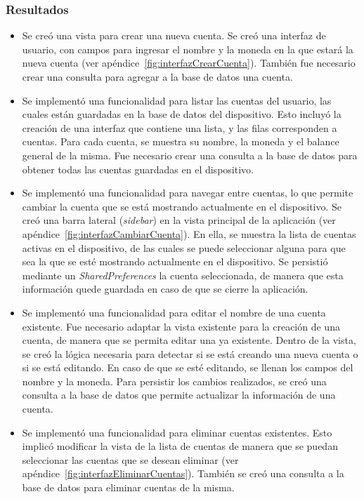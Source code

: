 \subsubsection{Resultados}
\begin{itemize}

\item Se creó una vista para crear una nueva cuenta. Se creó una interfaz de usuario, con campos para ingresar el nombre y la moneda en la que estará la nueva cuenta (ver apéndice~\ref{fig:interfazCrearCuenta}). También fue necesario crear una consulta para agregar a la base de datos una cuenta.
\item Se implementó una funcionalidad para listar las cuentas del usuario, las cuales están guardadas en la base de datos del dispositivo. Esto incluyó la creación de una interfaz que contiene una lista, y las filas corresponden a cuentas. Para cada cuenta, se muestra su nombre, la moneda y el balance general de la misma. Fue necesario crear una consulta a la base de datos para obtener todas las cuentas guardadas en el dispositivo.
\item Se implementó una funcionalidad para navegar entre cuentas, lo que permite cambiar la cuenta que se está mostrando actualmente en el dispositivo. Se creó una barra lateral (\textit{sidebar}) en la vista principal de la aplicación (ver apéndice~\ref{fig:interfazCambiarCuenta}). En ella, se muestra la lista de cuentas activas en el dispositivo, de las cuales se puede seleccionar alguna para que sea la que se esté mostrando actualmente en el dispositivo. Se persistió mediante un \textit{SharedPreferences} la cuenta seleccionada, de manera que esta información quede guardada en caso de que se cierre la aplicación.
\item Se implementó una funcionalidad para editar el nombre de una cuenta existente. Fue necesario adaptar la vista existente para la creación de una cuenta, de manera que se permita editar una ya existente. Dentro de la vista, se creó la lógica necesaria para detectar si se está creando una nueva cuenta o si se está editando. En caso de que se esté editando, se llenan los campos del nombre y la moneda. Para persistir los cambios realizados, se creó una consulta a la base de datos que permite actualizar la información de una cuenta. 
\item Se implementó una funcionalidad para eliminar cuentas existentes. Esto implicó modificar la vista de la lista de cuentas de manera que se puedan seleccionar las cuentas que se desean eliminar (ver apéndice~\ref{fig:interfazEliminarCuentas}). También se creó una consulta a la base de datos para eliminar cuentas de la misma.

\end{itemize}
